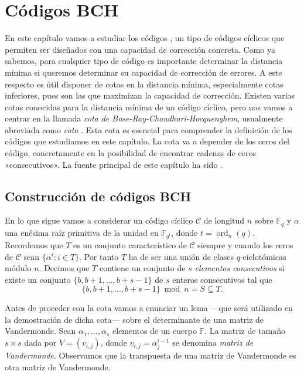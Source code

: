 

\chapter{Códigos BCH}


En este capítulo vamos a estudiar los códigos , un tipo de códigos cíclicos que permiten ser diseñados con una capacidad de corrección concreta.
Como ya sabemos, para cualquier tipo de código es importante determinar la distancia mínima si queremos determinar su capacidad de corrección de errores.
A este respecto es útil disponer de cotas en la distancia mínima, especialmente cotas inferiores, pues son las que maximizan la capacidad de corrección.
Existen varias cotas conocidas para la distancia mínima de un código cíclico, pero nos vamos a centrar en la llamada \textit{cota de Bose-Ray-Chaudhuri-Hocquenghem}, usualmente abreviada como \textit{cota }.
Esta cota es esencial para comprender la definición de los códigos  que estudiamos en este capítulo.
La cota  va a depender de los ceros del código, concretamente en la posibilidad de encontrar cadenas de ceros «consecutivos».
La fuente principal de este capítulo ha sido \parencite{huffman_fundamentals_2003}.

\section{Construcción de códigos BCH}

En lo que sigue vamos a considerar un código cíclico \(\mathcal C\)  de longitud \(n\) sobre \(\mathbb F_q\) y \(\alpha\) una enésima raíz primitiva de la unidad en \(\mathbb F_{q^t}\), donde \(t = \operatorname{ord}_n(q)\).
Recordemos que \(T\) es un conjunto característico de \(\mathcal C\) siempre y cuando los ceros de \(\mathcal C\) sean \(\{\alpha^{i} : i \in T\}\).
Por tanto \(T\) ha de ser una unión de clases \(q\)-ciclotómicas módulo \(n\).
Decimos que \(T\) contiene un conjunto de \(s\) \textit{elementos consecutivos} si existe un conjunto \(\{b, b + 1, \dots, b + s - 1\}\) de \(s\) enteros consecutivos tal que
\[
  \{b, b + 1, \dots, b + s - 1\} \bmod n = S \subseteq T.
\]

Antes de proceder con la cota  vamos a enunciar un lema —que será utilizado en la demostración de dicha cota— sobre el determinante de una matriz de Vandermonde.
Sean \(\alpha_1, \dots, \alpha_s\) elementos de un cuerpo \(\mathbb F\).
La matriz de tamaño \(s \times s\) dada por \(V = (v_{i, j})\), donde \(v_{i,j} = \alpha_{j}^{i-1}\) se denomina \textit{matriz de Vandermonde}.
Observamos que la transpuesta de una matriz de Vandermonde es otra matriz de Vandermonde.

